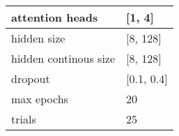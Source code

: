 \begin{tabular}{|p{4cm}|p{}|}
    \hline
    attention heads & [1, 4] \\ \hline
    hidden size & [8, 128] \\ \hline
    hidden continous size & [8, 128] \\ \hline
    dropout & [0.1, 0.4] \\ \hline
    max epochs & 20 \\ \hline
    trials & 25 \\ \hline
\end{tabular}
